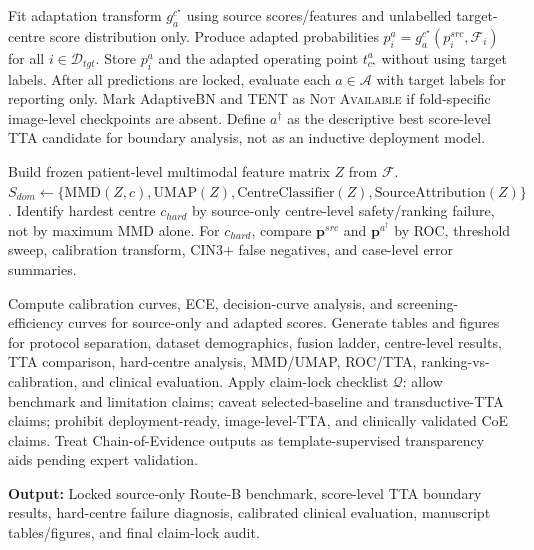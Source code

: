 \begin{algorithm}[htbp]
\begin{algorithmic}[1]
    \Statex {}
            \State Fit adaptation transform $g_a^{c^{\star}}$ using source scores/features and unlabelled target-centre score distribution only.
            \State Produce adapted probabilities $p^{a}_i=g_a^{c^{\star}}(p^{src}_i,\mathcal{F}_i)$ for all $i\in\mathcal{D}_{tgt}$.
            \State Store $p^{a}_i$ and the adapted operating point $t^{a}_{c^{\star}}$ without using target labels.
        \EndFor
    \EndFor
    \State After all predictions are locked, evaluate each $a\in\mathcal{A}$ with target labels for reporting only.
    \State Mark AdaptiveBN and TENT as \textsc{Not Available} if fold-specific image-level checkpoints are absent.
    \State Define $a^{\dagger}$ as the descriptive best score-level TTA candidate for boundary analysis, not as an inductive deployment model.

    \Statex {}
    \State Build frozen patient-level multimodal feature matrix $Z$ from $\mathcal{F}$.
    \State $S_{dom}\gets\{\mathrm{MMD}(Z,c),\mathrm{UMAP}(Z),\mathrm{CentreClassifier}(Z),\mathrm{SourceAttribution}(Z)\}$.
    \State Identify hardest centre $c_{hard}$ by source-only centre-level safety/ranking failure, not by maximum MMD alone.
    \State For $c_{hard}$, compare $\mathbf{p}^{src}$ and $\mathbf{p}^{a^{\dagger}}$ by ROC, threshold sweep, calibration transform, CIN3+ false negatives, and case-level error summaries.

    \Statex {}
    \State Compute calibration curves, ECE, decision-curve analysis, and screening-efficiency curves for source-only and adapted scores.
    \State Generate tables and figures for protocol separation, dataset demographics, fusion ladder, centre-level results, TTA comparison, hard-centre analysis, MMD/UMAP, ROC/TTA, ranking-vs-calibration, and clinical evaluation.
    \State Apply claim-lock checklist $\mathcal{Q}$: allow benchmark and limitation claims; caveat selected-baseline and transductive-TTA claims; prohibit deployment-ready, image-level-TTA, and clinically validated CoE claims.
    \State Treat Chain-of-Evidence outputs as template-supervised transparency aids pending expert validation.

    \Statex {}
    \State \textbf{Output:} Locked source-only Route-B benchmark, score-level TTA boundary results, hard-centre failure diagnosis, calibrated clinical evaluation, manuscript tables/figures, and final claim-lock audit.
\end{algorithmic}
\end{algorithm}
